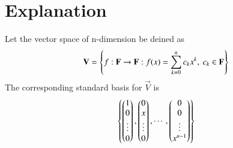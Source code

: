 \documentclass[journal,12pt,twocolumn]{IEEEtran}
\begin{document}
\section{Explanation}
Let the vector space of n-dimension be deined as
\begin{align}
        \mathbf{V}=\left\{f:\mathbf{F}\rightarrow \mathbf{F} : f(x)=\sum_{k=0}^{n}c_kx^k, \ c_k \in \mathbf{F} \right\}
\end{align}
The corresponding standard basis for $\vec{V}$ is
\begin{align}
	\left\{\begin{pmatrix}1\\0\\\vdots\\0\end{pmatrix},\begin{pmatrix}0\\x\\\vdots\\0\end{pmatrix},\cdots,\begin{pmatrix}0\\0\\\vdots\\x^{n-1}\end{pmatrix}\right\}
\end{align}
\end{document}
